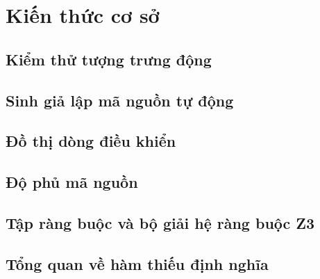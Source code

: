 \chapter{Kiến thức cơ sở}

\section{Kiểm thử tượng trưng động}

\section{Sinh giả lập mã nguồn tự động} \label{sec:autostub-Lam}

\section{Đồ thị dòng điều khiển} \label{sec:cfg}

\section{Độ phủ mã nguồn} \label{sec:coverage}

\section{Tập ràng buộc và bộ giải hệ ràng buộc Z3} \label{sec:z3}

\section{Tổng quan về hàm thiếu định nghĩa} \label{sec:kno-undefine}